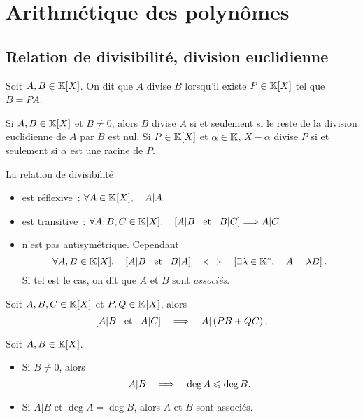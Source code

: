 \documentclass{magnolia}
\begin{document}
\magtoc


\section{Arithmétique des polynômes}

\subsection{Relation de divisibilité, division euclidienne}

\begin{definition}
Soit $A,B\in\polyK$. On dit que $A$ divise $B$ lorsqu'il existe $P\in\polyK$ tel
que $B=PA$.  
\end{definition}

\begin{remarques}
\remarque Si $A,B\in\polyK$ et $B\neq 0$, alors $B$ divise $A$ si et seulement
    si le reste de la division euclidienne de $A$ par $B$ est nul.
\remarque Si $P\in\polyK$ et $\alpha\in\mathbb{K}$, $X-\alpha$ divise $P$ si et
  seulement si $\alpha$ est une racine de $P$.
\end{remarques}

\begin{proposition}
La relation de divisibilité
\begin{itemize}
\item est réflexive~: $\forall A\in\polyK \qsep A|A.$
\item est transitive~: $\forall A,B,C\in\polyK \qsep \cro{A|B \et B|C}\implique
      A|C.$
\item n'est pas antisymétrique. Cependant
  \[\forall A,B\in\polyK \qsep \cro{A|B \et B|A}\quad\ssi\quad
    \cro{\exists \lambda\in\Ks \qsep A=\lambda B}.\]
  Si tel est le cas, on dit que $A$ et $B$ sont \emph{associés}.
\end{itemize}
\end{proposition}

\begin{proposition}
Soit $A,B,C\in\polyK$ et $P,Q\in\polyK$, alors
\[\left[A|B \quad\!\text{et}\quad\! A|C\right]\quad\Longrightarrow\quad A|\left(PB+QC\right).\]
\end{proposition}

\begin{proposition}
Soit $A,B\in\polyK$.
\begin{itemize}
\item Si $B\neq 0$, alors
  \[A|B \quad\Longrightarrow\quad \deg A\leqslant\deg B.\]
\item Si $A|B$ et $\deg A=\deg B$, alors $A$ et $B$ sont associés.
\end{itemize}
\end{proposition}
\end{document}
